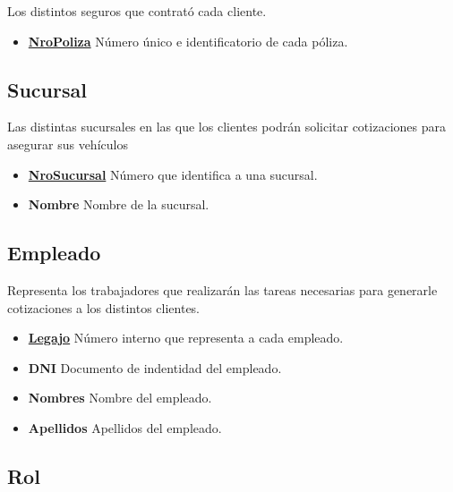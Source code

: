 \documentclass[a4paper,11pt]{article}
\begin{document}
Los distintos seguros que contrató cada cliente.

\begin{itemize}
   
  \item \textbf{\uline{NroPoliza}} Número único e identificatorio de cada póliza.
      
\end{itemize}

\subsection{Sucursal}

Las distintas sucursales en las que los clientes podrán solicitar cotizaciones para asegurar sus vehículos

\begin{itemize}
   
  \item \textbf{\uline{NroSucursal}} Número que identifica a una sucursal.
  
  \item \textbf{Nombre} Nombre de la sucursal.
  
\end{itemize}

\subsection{Empleado}

Representa los trabajadores que realizarán las tareas necesarias para generarle cotizaciones
a los distintos clientes.

\begin{itemize}
   
  \item \textbf{\uline{Legajo}} Número interno que representa a cada empleado.
  
  \item \textbf{DNI} Documento de indentidad del empleado.
  
  \item \textbf{Nombres} Nombre del empleado.
  
  \item \textbf{Apellidos} Apellidos del empleado.
  
\end{itemize}

\subsection{Rol}
\end{document}
